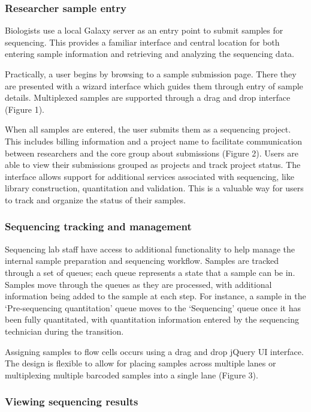 \documentclass[10pt]{bmc_article}
\newenvironment{bmcformat}{\begin{raggedright}\baselineskip20pt\sloppy\setboolean{publ}{false}}{\end{raggedright}\baselineskip20pt\sloppy}
\begin{document}
\begin{bmcformat}
\subsubsection*{Researcher sample entry}

Biologists use a local Galaxy server as an entry point to submit
samples for sequencing. This provides a familiar interface and central
location for both entering sample information and retrieving and
analyzing the sequencing data.

Practically, a user begins by browsing to a sample submission
page. There they are presented with a wizard interface which guides
them through entry of sample details. Multiplexed samples are
supported through a drag and drop interface (Figure 1).

When all samples are entered, the user submits them as a sequencing
project. This includes billing information and a project name to
facilitate communication between researchers and the core group
about submissions (Figure 2). Users are able to view their submissions
grouped as projects and track project status. The interface
allows support for additional services associated with sequencing,
like library construction, quantitation and validation. This is a
valuable way for users to track and organize the status of their
samples.

\subsubsection*{Sequencing tracking and management}

Sequencing lab staff have access to additional
functionality to help manage the internal sample preparation and
sequencing workflow. Samples are tracked through
a set of queues; each queue represents a state that a sample can be
in. Samples move through the queues as they are processed, with
additional information being added to the sample at each step. For
instance, a sample in the ‘Pre-sequencing quantitation’ queue moves to
the ‘Sequencing’ queue once it has been fully quantitated, with
quantitation information entered by the sequencing technician during
the transition.

Assigning samples to flow cells occurs using a drag and drop jQuery UI
interface. The design is flexible to allow for placing samples across
multiple lanes or multiplexing multiple barcoded samples into a single
lane (Figure 3).

\subsubsection*{Viewing sequencing results}


\end{bmcformat}
\end{document}
